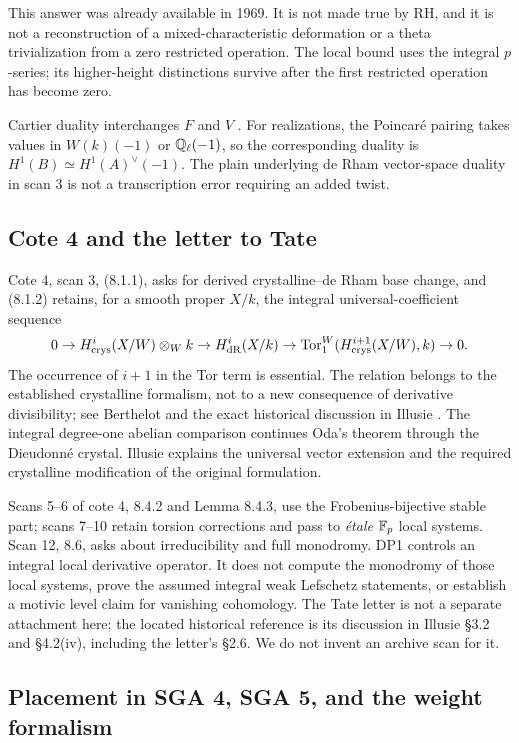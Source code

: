 \documentclass[11pt,a4paper]{article}
\theoremstyle{definition}\newtheorem{remark}[theorem]{Remark}
\begin{document}
This answer was already available in 1969. It is not made true by RH, and it is not a reconstruction of a mixed-characteristic deformation or a theta trivialization from a zero restricted operation. The local bound uses the integral $p$-series; its higher-height distinctions survive after the first restricted operation has become zero.

Cartier duality interchanges $F$ and $V$ \cite[Theorem 3.19, p.~89]{Oda}. For realizations, the Poincar\'e pairing takes values in $W(k)(-1)$ or $\mathbb Q_\ell(-1)$, so the corresponding duality is $H^1(B)\simeq H^1(A)^\vee(-1)$. The plain underlying de Rham vector-space duality in scan 3 is not a transcription error requiring an added twist.

\subsection{Cote 4 and the letter to Tate}

Cote 4, scan 3, (8.1.1), asks for derived crystalline--de Rham base change, and (8.1.2) retains, for a smooth proper $X/k$, the integral universal-coefficient sequence
\[
 0\to H^i_{\mathrm{crys}}(X/W)\otimes_Wk\to H^i_{\mathrm{dR}}(X/k)
 \to\operatorname{Tor}_1^W(H^{i+1}_{\mathrm{crys}}(X/W),k)\to0.
\]
The occurrence of $i+1$ in the Tor term is essential. The relation belongs to the established crystalline formalism, not to a new consequence of derivative divisibility; see Berthelot \cite[V.3.6]{Berthelot} and the exact historical discussion in Illusie \cite[\S3.2, pp.~9--11]{Illusie}. The integral degree-one abelian comparison continues Oda's theorem through the Dieudonn\'e crystal. Illusie \cite[\S4.2(iv), pp.~16--17]{Illusie} explains the universal vector extension and the required crystalline modification of the original formulation.

Scans 5--6 of cote 4, 8.4.2 and Lemma 8.4.3, use the Frobenius-bijective stable part; scans 7--10 retain torsion corrections and pass to \emph{\'etale} $\mathbb F_p$ local systems. Scan 12, 8.6, asks about irreducibility and full monodromy. DP1 controls an integral local derivative operator. It does not compute the monodromy of those local systems, prove the assumed integral weak Lefschetz statements, or establish a motivic level claim for vanishing cohomology. The Tate letter is not a separate attachment here; the located historical reference is its discussion in Illusie \S3.2 and \S4.2(iv), including the letter's \S2.6. We do not invent an archive scan for it.

\subsection{Placement in SGA 4, SGA 5, and the weight formalism}
\end{document}
